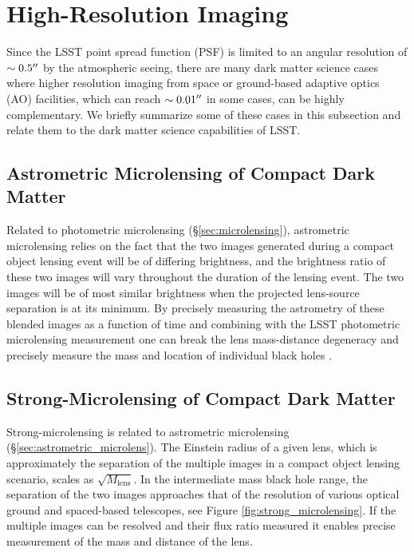 
\section{High-Resolution Imaging }
\label{sec:highres}

Since the LSST point spread function (PSF) is limited to an angular resolution of $\sim 0.5''$ by the atmospheric seeing, there are many dark matter science cases where higher resolution imaging from space or ground-based adaptive optics (AO) facilities, which can reach $\sim 0.01''$ in some cases, can be highly complementary. We briefly summarize some of these cases in this subsection and relate them to the dark matter science capabilities of LSST.

\subsection{Astrometric Microlensing of Compact Dark Matter }
\label{sec:astrometric_microlens}
Related to photometric microlensing (\S\ref{sec:microlensing}), astrometric microlensing relies on the fact that the two images generated during a compact object lensing event will be of differing brightness, and the brightness ratio of these two images will vary throughout the duration of the lensing event.
The two images will be of most similar brightness when the projected lens-source separation is at its minimum.
By precisely measuring the astrometry of these blended images as a function of time and combining with the LSST photometric microlensing measurement one can break the lens mass-distance degeneracy and precisely measure the mass and location of individual black holes \cite{2015ApJ...814L..11Y}.

\subsection{Strong-Microlensing of Compact Dark Matter }
Strong-microlensing is related to astrometric microlensing (\S\ref{sec:astrometric_microlens}).
The Einstein radius of a given lens, which is approximately the separation of the multiple images in a compact object lensing scenario, scales as $\sqrt{M_\mathrm{lens}}$.
In the intermediate mass black hole range, the separation of the two images approaches that of the resolution of various optical ground and spaced-based telescopes, see Figure \ref{fig:strong_microlensing}.
If the multiple images can be resolved and their flux ratio measured it enables precise measurement of the mass and distance of the lens.

